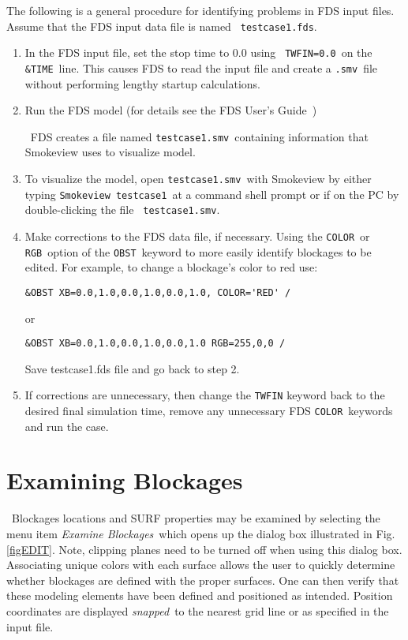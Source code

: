 \documentclass[11pt,twoside]{book}
\begin{document}
The following is a general procedure for identifying problems in
FDS input files. Assume that the FDS input data file is named {\tt
testcase1.fds}.
\begin{enumerate}
\item In the FDS input file, set the stop time to $0.0$ using {\tt
TWFIN=0.0}\ on the {\tt \&TIME}\ line. This causes FDS to read the
input file and create a {\tt .smv}\ file without  performing
lengthy startup calculations.

\item Run the FDS model (for details see the FDS User's
Guide~\cite{FDS_Users_Guide})

\noindent\ FDS creates a file named {\tt testcase1.smv}\ containing
information that Smokeview uses to visualize model.

\item To visualize the model, open {\tt testcase1.smv}\ with
Smokeview by either typing {\tt Smokeview testcase1}\ at a command
shell prompt or if on the PC by double-clicking the file {\tt
testcase1.smv}.

\item Make corrections to the FDS data file, if necessary. Using the {\tt COLOR}\ or {\tt
RGB}\ option of the
{\tt OBST}\ keyword to more easily identify blockages to be edited.
For example, to change a blockage's color to red use:
\begin{lstlisting}
&OBST XB=0.0,1.0,0.0,1.0,0.0,1.0, COLOR='RED' /
\end{lstlisting}
\noindent or
\begin{lstlisting}
&OBST XB=0.0,1.0,0.0,1.0,0.0,1.0 RGB=255,0,0 /
\end{lstlisting}

\noindent Save testcase1.fds file and go back to step 2.

\item If corrections are unnecessary, then change the {\tt TWFIN}
keyword back to the desired final simulation time, remove any
unnecessary FDS {\tt COLOR}\ keywords and run the case.
\end{enumerate}

\section{Examining Blockages}\  Blockages locations and SURF
properties may be examined by selecting the menu item {\em Examine
Blockages}\ which opens up the dialog box illustrated in Fig.
\ref{figEDIT}. Note, clipping planes need to be turned off when
using this dialog box. Associating unique colors with each surface
allows the user to quickly determine whether blockages are defined
with the proper surfaces. One can then verify that these modeling
elements have been defined and positioned as intended. Position
coordinates are displayed {\em snapped}\ to the nearest grid line
or as specified in the input file.
\end{document}
